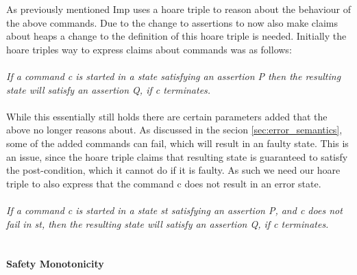 As previously mentioned Imp uses a hoare triple to reason about the behaviour of the above commands. Due to the change to assertions to now also make claims about heaps a change to the definition of this hoare triple is needed. Initially the hoare triples way to express claims about commands was as follows:
\\
\\
\textit{If a command c is started in a state satisfying an assertion P then the resulting state will satisfy an assertion Q, if c terminates.}
\\
\\
While this essentially still holds there are certain parameters added that the above no longer reasons about. As discussed in the secion \ref{sec:error_semantics}, some of the added commands can fail, which will result in an faulty state. This is an issue, since the hoare triple claims that resulting state is guaranteed to satisfy the post-condition, which it cannot do if it is faulty. As such we need our hoare triple to also express that the command c does not result in an error state.
\\
\\
\textit{If a command c is started in a state st satisfying an assertion P, and c does not fail in st, then the resulting state will satisfy an assertion Q, if c terminates.}
\\
\\
\paragraph{Safety Monotonicity}